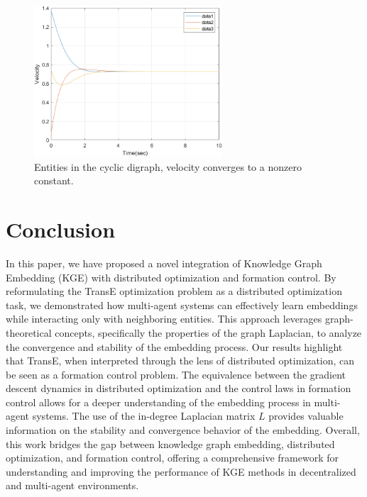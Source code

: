 \documentclass[letterpaper, 10 pt, conference]{ieeeconf}  %
\begin{document}
\begin{figure}[thb]
\begin{center}
\includegraphics[width=7cm]{IMG/DCGvelocity.png}
\caption{Entities in the cyclic digraph, velocity converges to a nonzero constant.}
\label{fig:DCGvelocity}
\end{center}
\vspace{-0mm}
\end{figure}


\section{Conclusion}
In this paper, we have proposed a novel integration of Knowledge Graph Embedding (KGE) with distributed optimization and formation control. 
By reformulating the TransE optimization problem as a distributed optimization task, we demonstrated how multi-agent systems can effectively learn embeddings while interacting only with neighboring entities. 
This approach leverages graph-theoretical concepts, specifically the properties of the graph Laplacian, to analyze the convergence and stability of the embedding process.
Our results highlight that TransE, when interpreted through the lens of distributed optimization, can be seen as a formation control problem. 
The equivalence between the gradient descent dynamics in distributed optimization and the control laws in formation control allows for a deeper understanding of the embedding process in multi-agent systems.
The use of the in-degree Laplacian matrix \(L\) provides valuable information on the stability and convergence behavior of the embedding.
Overall, this work bridges the gap between knowledge graph embedding, distributed optimization, and formation control, offering a comprehensive framework for understanding and improving the performance of KGE methods in decentralized and multi-agent environments.




\end{document}
